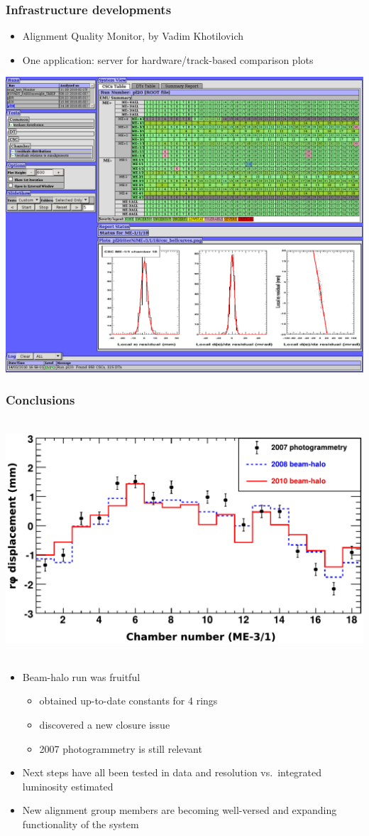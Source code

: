\documentclass[compress]{beamer}
\begin{document}
\begin{frame}
\frametitle{Infrastructure developments}

\begin{itemize}
\item Alignment Quality Monitor, by Vadim Khotilovich
\item One application: server for hardware/track-based comparison plots
\end{itemize}

\begin{center}
\includegraphics[width=0.8\linewidth]{vadims_browser.png}
\end{center}
\end{frame}

\begin{frame}
\frametitle{Conclusions}

\mbox{ } \hfill \includegraphics[width=0.6\linewidth]{compare_m31_x.pdf} \hfill \mbox{ }

\begin{itemize}
\item Beam-halo run was fruitful
\begin{itemize}
\item obtained up-to-date constants for 4 rings
\item discovered a new closure issue
\item 2007 photogrammetry is still relevant
\end{itemize}

\item Next steps have all been tested in data and resolution vs.\ integrated luminosity estimated

\item New alignment group members are becoming well-versed and expanding functionality of the system
\end{itemize}

\label{numpages}
\end{frame}
\end{document}
